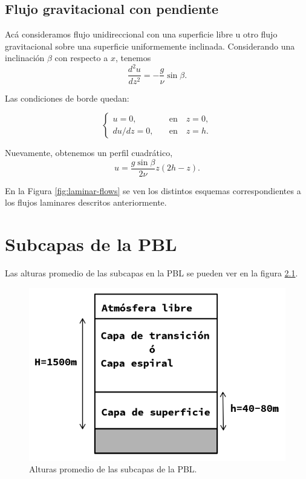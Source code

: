 \documentclass[openany]{book}
\begin{document}
\section{Flujo gravitacional con pendiente}
Acá consideramos flujo unidireccional con una superficie libre 
u otro flujo gravitacional sobre una superficie uniformemente
inclinada. Considerando una inclinación $\beta$ con respecto a
$x$, tenemos
\begin{equation}
    \frac{d^2u}{dz^2}=-\frac{g}{\nu}\sin{\beta}.
\end{equation}

\par Las condiciones de borde quedan:

\begin{equation}
    \begin{cases}
        u=0,&\quad \mathrm{en}\quad z=0,\\
        du/dz=0,&\quad \mathrm{en}\quad z=h.
    \end{cases}
\end{equation}

\par Nuevamente, obtenemos un perfil cuadrático,
\begin{equation}
    u=\frac{g\sin\beta}{2\nu}z(2h-z).
\end{equation}

En la Figura \ref{fig:laminar-flows} se ven los distintos esquemas
correspondientes a los flujos laminares descritos anteriormente.


\chapter{Subcapas de la PBL}
Las alturas promedio de las subcapas en la PBL se pueden ver en la
figura \ref{fig:subcapas-pbl}.
\begin{figure}[htbp]
    \centering
    \includegraphics[width=0.8\linewidth]{img/subcapas_PBL.png}
    \caption{Alturas promedio de las subcapas de la PBL.}
    \label{fig:subcapas-pbl}
\end{figure}
\end{document}
